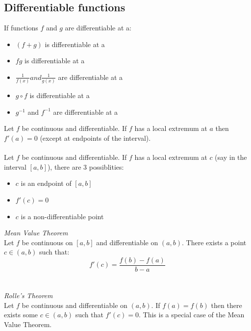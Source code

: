 \documentclass{scrartcl}
\begin{document}
\subsection{Differentiable functions}
If functions $ f $ and $ g $ are differentiable at a:
\begin{itemize}
\item $ (f + g) $ is differentiable at a
\item $ fg $ is differentiable at a
\item $ \frac{1}{f(x)} and \frac{1}{g(x)} $ are differentiable at a
\item $ g \circ f $ is differentiable at a
\item $ g^{-1} $ and $ f^{-1} $ are differentiable at a
\end{itemize}
Let $ f $ be continuous and differentiable. If $ f $ has a local extremum at $ a $ then $ f'(a) = 0 $ (except at endpoints of the interval).
\\\\
Let $ f $ be continuous and differentiable. If $ f $ has a local extremum at $ c $ (say in the interval $ [a, b] $), there are 3 possiblities:
\begin{itemize}
\item $ c $ is an endpoint of $ [a, b] $
\item $ f'(c) = 0 $
\item $ c $ is a non-differentiable point
\end{itemize}
\textit{Mean Value Theorem}
\\
Let $ f $ be continuous on $ [a, b] $ and differentiable on $ (a, b) $. There exists a point $ c \in (a, b) $ such that:
\begin{equation}
f'(c) = \frac{f(b) - f(a)}{b - a}
\end{equation}
\\\\
\textit{Rolle's Theorem}
\\
Let $ f $ be continuous and differentiable on $ (a, b) $. If $ f(a) = f(b) $ then there exists some $ c \in (a, b) $ such that $ f'(c) = 0 $. This is a special case of the Mean Value Theorem.
\end{document}
